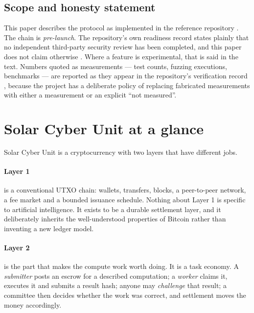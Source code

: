 \documentclass{article}
\begin{document}
\subsection{Scope and honesty statement}

This paper describes the protocol as implemented in the reference repository
\cite{srct-repo,srct-spec}. The chain is \emph{pre-launch}. The repository's
own readiness record states plainly that no independent third-party security
review has been completed, and this paper does not claim otherwise
\cite{srct-readiness}. Where a feature is experimental, that is said in the
text. Numbers quoted as measurements --- test counts, fuzzing executions,
benchmarks --- are reported as they appear in the repository's verification
record \cite{srct-status,srct-fuzz}, because the project has a deliberate
policy of replacing fabricated measurements with either a measurement or an
explicit ``not measured''.


\section{Solar Cyber Unit at a glance}
\label{sec:glance}

Solar Cyber Unit is a cryptocurrency with two layers that have different jobs.

\paragraph{Layer 1} is a conventional UTXO chain: wallets, transfers, blocks,
a peer-to-peer network, a fee market and a bounded issuance schedule. Nothing
about Layer 1 is specific to artificial intelligence. It exists to be a durable
settlement layer, and it deliberately inherits the well-understood properties
of Bitcoin \cite{nakamoto2008bitcoin,antonopoulos2017mastering} rather than
inventing a new ledger model.

\paragraph{Layer 2} is the part that makes the compute work worth doing. It is a
task economy. A \emph{submitter} posts an escrow for a described computation; a
\emph{worker} claims it, executes it and submits a result hash; anyone may
\emph{challenge} that result; a committee then decides whether the work was
correct, and settlement moves the money accordingly.
\end{document}

